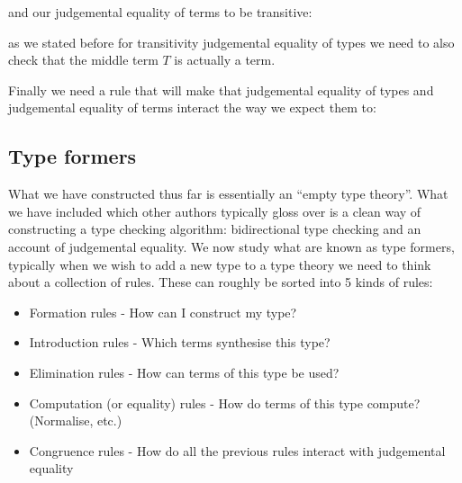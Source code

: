 \begin{defin}
    and our judgemental equality of terms to be transitive:
    \begin{prooftree}
    \end{prooftree}

    as we stated before for transitivity judgemental equality of types we need to also check that the middle term $T$ is actually a term.

    Finally we need a rule that will make  that judgemental equality of types and judgemental equality of terms interact the way we expect them to:
    \begin{prooftree}
    \end{prooftree}
\end{defin}

\subsection{Type formers}
What we have constructed thus far is essentially an ``empty type theory''. What we have included which other authors typically gloss over is a clean way of constructing a type checking algorithm: bidirectional type checking and an account of judgemental equality. We now study what are known as type formers, typically when we wish to add a new type to a type theory we need to think about a collection of rules. These can roughly be sorted into 5 kinds of rules:

\begin{itemize}
    \item Formation rules - How can I construct my type?
    \item Introduction rules - Which terms synthesise this type?
    \item Elimination rules - How can terms of this type be used?
    \item Computation (or equality) rules - How do terms of this type compute? (Normalise, etc.)
    \item Congruence rules - How do all the previous rules interact with judgemental equality
\end{itemize}

